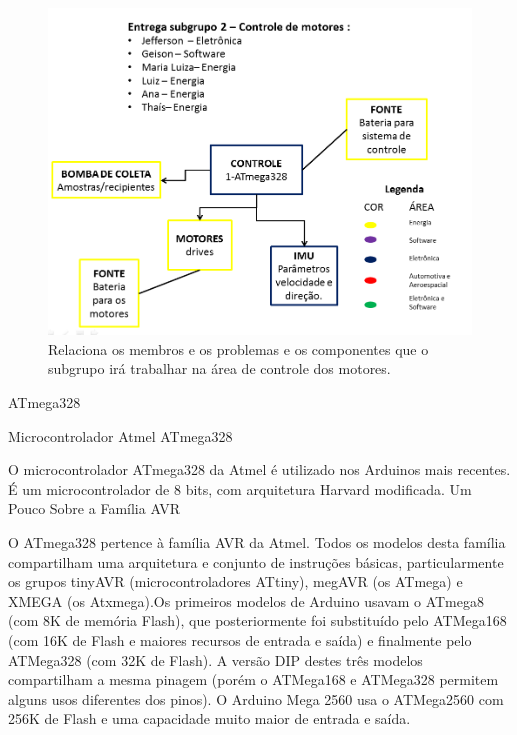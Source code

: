 \begin{figure} [!htp]
	\centering
	\includegraphics[scale=0.6]{figuras/subgrupocontroledosmotores}
	\caption{Relaciona os membros e os problemas e os componentes que o subgrupo irá trabalhar na área de controle dos motores.}
	\label{subgrupocontroledosmotores}
\end{figure}
\FloatBarrier
ATmega328
              
Microcontrolador Atmel ATmega328

O microcontrolador ATmega328 da Atmel é utilizado nos Arduinos mais recentes. É um microcontrolador de 8 bits, com arquitetura Harvard modificada. Um Pouco Sobre a Família AVR

O ATmega328 pertence à família AVR da Atmel. Todos os modelos desta família compartilham uma arquitetura e conjunto de instruções básicas, particularmente os grupos tinyAVR (microcontroladores ATtiny), megAVR (os ATmega) e XMEGA (os Atxmega).Os primeiros modelos de Arduino usavam o ATmega8 (com 8K de memória Flash), que posteriormente foi substituído pelo ATMega168 (com 16K de Flash e maiores recursos de entrada e saída) e finalmente pelo ATMega328 (com 32K de Flash). A versão DIP destes três modelos compartilham a mesma pinagem (porém o ATMega168 e ATMega328 permitem alguns usos diferentes dos pinos). O Arduino Mega 2560 usa o ATMega2560 com 256K de Flash e uma capacidade muito maior de entrada e saída.




